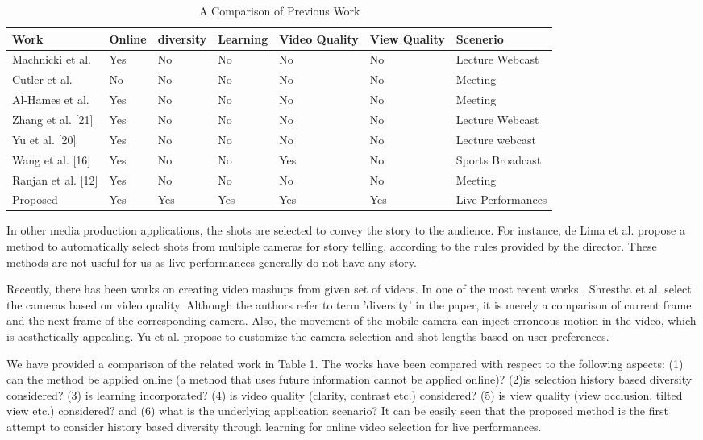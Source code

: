 \documentclass{sig-alternate}
\begin{document}
\begin{table}
\centering
\caption{ A Comparison of Previous Work }
\begin{tabular}{p{3.2cm}|p{2cm}|p{2cm}|p{2cm}|p{2cm}|p{2cm}|p{3.2cm}} \hline
Work&Online&diversity&Learning&Video Quality &View Quality&Scenerio\\ \hline
Machnicki et al.\cite{clayton1987materials}&Yes&No&No&No&No&Lecture Webcast\\ \hline
Cutler et al.\cite{paddle2006effect}&No&No&No&No&No&Meeting\\ \hline
Al-Hames et al.\cite{wyszecki1982color} &Yes& No& No& No& No& Meeting\\ \hline
Zhang et al. [21] &Yes &No &No &No &No &Lecture Webcast\\ \hline
Yu et al. [20] &Yes &No &No &No &No &Lecture webcast\\ \hline
Wang et al. [16] &Yes &No &No &Yes &No &Sports Broadcast\\ \hline
Ranjan et al. [12] &Yes &No &No &No &No &Meeting\\ \hline
Proposed &Yes &Yes &Yes &Yes& Yes &Live Performances\\ \hline
\end{tabular}
\end{table}
 
 In other media production applications, the shots are selected to convey the story to the audience. For instance, de Lima et al. \cite{paddle2006effect} propose a method to automatically select shots from multiple cameras for story telling, according to the rules provided by the director. These methods are not useful for us as live performances generally do not have any story. 
 
 Recently, there has been works on creating video mashups from given set of videos. In one of the most recent works \cite{economou1983green}, Shrestha et al. select the cameras based on video quality. Although the authors refer to term 'diversity' in the paper, it is merely a comparison of current frame and the next frame of the corresponding camera. Also, the movement of the mobile camera can inject erroneous motion in the video, which is aesthetically appealing. Yu et al. \cite{wyszecki1982color} propose to customize the camera selection and shot lengths based on user preferences.
 
 We have provided a comparison of the related work in Table 1. The works have been compared with respect to the following aspects: (1) can the method be applied online (a method that uses future information cannot be applied online)? (2)is selection history based diversity considered? (3) is learning incorporated? (4) is video quality (clarity, contrast etc.) considered? (5) is view quality (view occlusion, tilted view etc.) considered? and (6) what is the underlying application scenario? It can be easily seen that the proposed method is the ﬁrst attempt to consider history based diversity through learning for online video selection for live performances.
 
\end{document}
